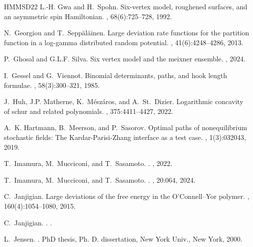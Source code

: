 \documentclass[reqno,11pt]{amsart}
\numberwithin{equation}{section}
\theoremstyle{definition}
\begin{document}
\begin{thebibliography}{HMMSD22}
L.-H. Gwa and H.~Spohn.
\newblock Six-vertex model, roughened surfaces, and an asymmetric spin {H}amiltonian.
, 68(6):725--728, 1992.

N.~Georgiou and T.~Sepp{\"a}l{\"a}inen.
\newblock Large deviation rate functions for the partition function in a log-gamma distributed random potential.
, 41(6):4248--4286, 2013.

P.~Ghosal and G.L.F. Silva.
\newblock Six vertex model and the meixner ensemble.
, 2024.

I.~Gessel and G.~Viennot.
\newblock Binomial determinants, paths, and hook length formulae.
, 58(3):300--321, 1985.

J.~Huh, J.P. Matherne, K.~Mészáros, and A.~St.~Dizier.
\newblock Logarithmic concavity of schur and related polynomials.
, 375:4411--4427, 2022.

A.~K. Hartmann, B.~Meerson, and P.~Sasorov.
\newblock Optimal paths of nonequilibrium stochastic fields: The {K}ardar{-P}arisi{-Z}hang interface as a test case.
, 1(3):032043, 2019.

T.~Imamura, M.~Mucciconi, and T.~Sasamoto.
.
, 2022.

T.~Imamura, M.~Mucciconi, and T.~Sasamoto.
.
, 20:064, 2024.

C.~Janjigian.
\newblock Large deviations of the free energy in the {O’C}onnell--{Y}or polymer.
, 160(4):1054--1080, 2015.

C.~Janjigian.
.
.

L.~Jensen.
.
\newblock PhD thesis, Ph. D. dissertation, New York Univ., New York, 2000.


\end{thebibliography}
\end{document}
